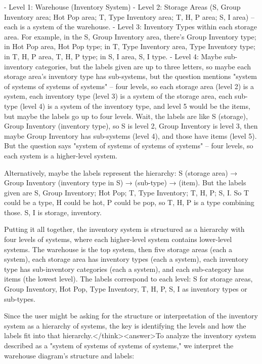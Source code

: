- Level 1: Warehouse (Inventory System)
- Level 2: Storage Areas (S, Group Inventory area; Hot Pop area; T, Type Inventory area; T, H, P area; S, I area) – each is a system of the warehouse.
- Level 3: Inventory Types within each storage area. For example, in the S, Group Inventory area, there's Group Inventory type; in Hot Pop area, Hot Pop type; in T, Type Inventory area, Type Inventory type; in T, H, P area, T, H, P type; in S, I area, S, I type.
- Level 4: Maybe sub-inventory categories, but the labels given are up to three letters, so maybe each storage area's inventory type has sub-systems, but the question mentions "system of systems of systems of systems" – four levels, so each storage area (level 2) is a system, each inventory type (level 3) is a system of the storage area, each sub-type (level 4) is a system of the inventory type, and level 5 would be the items, but maybe the labels go up to four levels. Wait, the labels are like S (storage), Group Inventory (inventory type), so S is level 2, Group Inventory is level 3, then maybe Group Inventory has sub-systems (level 4), and those have items (level 5). But the question says "system of systems of systems of systems" – four levels, so each system is a higher-level system. 

Alternatively, maybe the labels represent the hierarchy: S (storage area) → Group Inventory (inventory type in S) → (sub-type) → (item). But the labels given are S, Group Inventory; Hot Pop; T, Type Inventory; T, H, P; S, I. So T could be a type, H could be hot, P could be pop, so T, H, P is a type combining those. S, I is storage, inventory. 

Putting it all together, the inventory system is structured as a hierarchy with four levels of systems, where each higher-level system contains lower-level systems. The warehouse is the top system, then five storage areas (each a system), each storage area has inventory types (each a system), each inventory type has sub-inventory categories (each a system), and each sub-category has items (the lowest level). The labels correspond to each level: S for storage areas, Group Inventory, Hot Pop, Type Inventory, T, H, P, S, I as inventory types or sub-types. 

Since the user might be asking for the structure or interpretation of the inventory system as a hierarchy of systems, the key is identifying the levels and how the labels fit into that hierarchy.</think><answer>To analyze the inventory system described as a "system of systems of systems of systems," we interpret the warehouse diagram’s structure and labels:  

